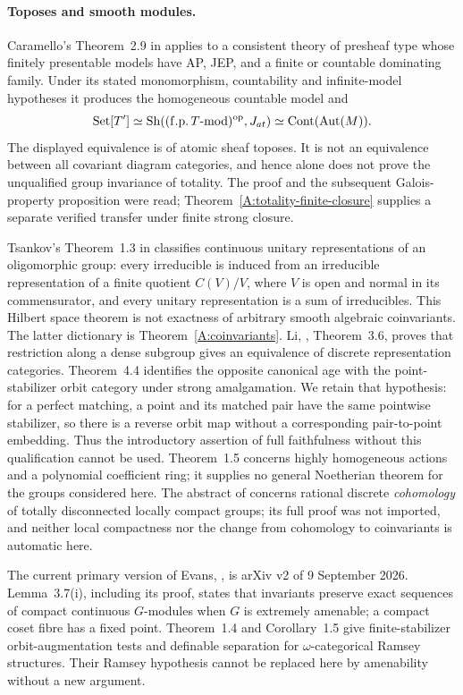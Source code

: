 \paragraph{Toposes and smooth modules.}
Caramello's Theorem~2.9 in \cite{ABCaramello2008} applies to a
consistent theory of presheaf type whose finitely presentable
models have AP, JEP, and a finite or countable dominating family.
Under its stated monomorphism, countability and infinite-model
hypotheses it produces the homogeneous countable model and
\[
 \mathrm{Set}[T']\simeq
 \operatorname{Sh}((\mathrm{f.p.}\,T\text{-}\mathrm{mod})^{\mathrm{op}},J_{at})
 \simeq\operatorname{Cont}(\operatorname{Aut}(M)).
\]
The displayed equivalence is of atomic sheaf toposes. It is not
an equivalence between all covariant diagram categories, and hence
alone does not prove the unqualified group invariance of totality.
The proof and the subsequent Galois-property proposition were read;
Theorem~\ref{A:totality-finite-closure} supplies a separate verified
transfer under finite strong closure.

Tsankov's Theorem~1.3 in \cite{ABTsankov2012} classifies continuous
unitary representations of an oligomorphic group: every irreducible
is induced from an irreducible representation of a finite quotient
$C(V)/V$, where $V$ is open and normal in its commensurator, and
every unitary representation is a sum of irreducibles. This Hilbert
space theorem is not exactness of arbitrary smooth algebraic
coinvariants. The latter dictionary is Theorem~\ref{A:coinvariants}.
Li, \cite{ABLi2025}, Theorem~3.6, proves that restriction along a
dense subgroup gives an equivalence of discrete representation
categories. Theorem~4.4 identifies the opposite canonical age with
the point-stabilizer orbit category under strong amalgamation.
We retain that hypothesis: for a perfect matching, a point and its
matched pair have the same pointwise stabilizer, so there is a
reverse orbit map without a corresponding pair-to-point embedding.
Thus the introductory assertion of full faithfulness without this
qualification cannot be used. Theorem~1.5 concerns highly
homogeneous actions and a polynomial coefficient ring; it supplies
no general Noetherian theorem for the groups considered here.
The abstract of \cite{ABCastellanoWeigel} concerns rational discrete
\emph{cohomology} of totally disconnected locally compact groups;
its full proof was not imported, and neither local compactness nor
the change from cohomology to coinvariants is automatic here.

The current primary version of Evans, \cite{ABEvans2026}, is
arXiv v2 of 9 September 2026. Lemma~3.7(i), including its proof,
states that invariants preserve exact sequences of compact
continuous $G$-modules when $G$ is extremely amenable; a compact
coset fibre has a fixed point. Theorem~1.4 and Corollary~1.5 give
finite-stabilizer orbit-augmentation tests and definable separation
for $\omega$-categorical Ramsey structures. Their Ramsey hypothesis
cannot be replaced here by amenability without a new argument.

